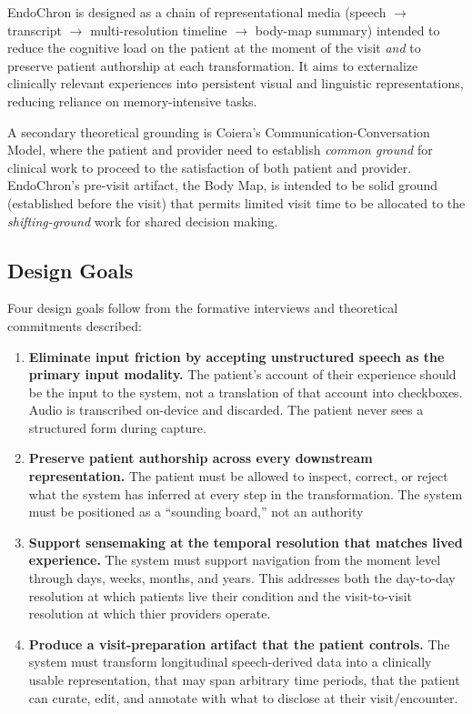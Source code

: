 EndoChron is designed as a chain of representational media (speech $\rightarrow$ transcript $\rightarrow$ multi-resolution timeline $\rightarrow$ body-map summary) intended to reduce the cognitive load on the patient at the moment of the visit \textit{and} to preserve patient authorship at each transformation. It aims to externalize clinically relevant experiences into persistent visual and linguistic representations, reducing reliance on memory-intensive tasks.

A secondary theoretical grounding is Coiera's Communication-Conversation Model\cite{Coiera2000ConversationModel}, where the patient and provider need to establish \textit{common ground} for clinical work to proceed to the satisfaction of both patient and provider. EndoChron's pre-visit artifact, the Body Map, is intended to be solid ground (established before the visit) that permits limited visit time to be allocated to the \textit{shifting-ground} work for shared decision making.

\subsection{Design Goals}
\label{sec:design-goals}

Four design goals follow from the formative interviews and theoretical commitments described:

\begin{enumerate}[label=\textbf{DG\arabic*.},leftmargin=*,labelsep=0.5em]
  \item \textbf{Eliminate input friction by accepting unstructured speech as the primary input modality.} The patient's account of their experience should be the input to the system, not a translation of that account into checkboxes. Audio is transcribed on-device and discarded. The patient never sees a structured form during capture.
  \item \textbf{Preserve patient authorship across every downstream representation.} The patient must be allowed to inspect, correct, or reject what the system has inferred at every step in the transformation. The system must be positioned as a ``sounding board,'' not an authority\cite{Pichon2025Betrayal}
  \item \textbf{Support sensemaking at the temporal resolution that matches lived experience.} The system must support navigation from the moment level through days, weeks, months, and years. This addresses both the day-to-day resolution at which patients live their condition and the visit-to-visit resolution at which thier providers operate\cite{Pichon2021Divided}.
  \item \textbf{Produce a visit-preparation artifact that the patient controls.} The system must transform longitudinal speech-derived data into a clinically usable representation, that may span arbitrary time periods, that the patient can curate, edit, and annotate with what to disclose at their visit/encounter.
\end{enumerate}

